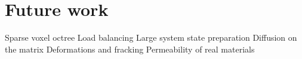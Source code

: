 \section{Future work}
Sparse voxel octree
Load balancing
Large system state preparation
Diffusion on the matrix
Deformations and fracking
Permeability of real materials